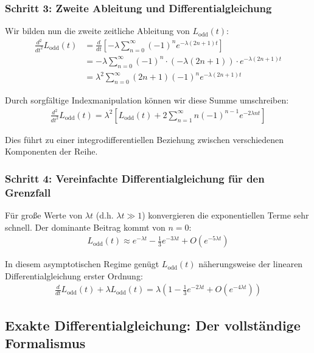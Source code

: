\documentclass[a4paper, 12pt, twoside, openright]{report}
\theoremstyle{definition}
\theoremstyle{definition}
\begin{document}
\subsubsection*{Schritt 3: Zweite Ableitung und Differentialgleichung}

Wir bilden nun die zweite zeitliche Ableitung von $L_{\text{odd}}(t)$:
\begin{align}
	\frac{d^2}{dt^2} L_{\text{odd}}(t) &= \frac{d}{dt} \left[ -\lambda \sum_{n=0}^{\infty} (-1)^n e^{-\lambda(2n+1)t} \right] \\
	&= -\lambda \sum_{n=0}^{\infty} (-1)^n \cdot (-\lambda(2n+1)) \cdot e^{-\lambda(2n+1)t} \\
	&= \lambda^2 \sum_{n=0}^{\infty} (2n+1)(-1)^n e^{-\lambda(2n+1)t}
\end{align}

Durch sorgfältige Indexmanipulation können wir diese Summe umschreiben:
\begin{align}
	\frac{d^2}{dt^2} L_{\text{odd}}(t) = \lambda^2 \left[ L_{\text{odd}}(t) + 2 \sum_{n=1}^{\infty} n(-1)^{n-1} e^{-2\lambda n t} \right]
\end{align}

Dies führt zu einer integrodifferentiellen Beziehung zwischen verschiedenen Komponenten der Reihe.

\subsubsection*{Schritt 4: Vereinfachte Differentialgleichung für den Grenzfall}

Für große Werte von $\lambda t$ (d.h. $\lambda t \gg 1$) konvergieren die exponentiellen Terme sehr schnell. Der dominante Beitrag kommt von $n=0$:
\begin{align}
	L_{\text{odd}}(t) \approx e^{-\lambda t} - \frac{1}{3} e^{-3\lambda t} + O(e^{-5\lambda t})
\end{align}

In diesem asymptotischen Regime genügt $L_{\text{odd}}(t)$ näherungsweise der linearen Differentialgleichung erster Ordnung:
\begin{align}
	\frac{d}{dt} L_{\text{odd}}(t) + \lambda L_{\text{odd}}(t) = \lambda \left( 1 - \frac{1}{3} e^{-2\lambda t} + O(e^{-4\lambda t}) \right)
\end{align}

\subsection{Exakte Differentialgleichung: Der vollständige Formalismus}
\end{document}
